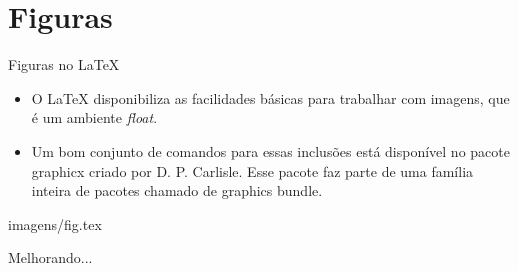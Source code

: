\section{Figuras}

\begin{frame}{Figuras no \LaTeX{}}
\begin{block}{}
\begin{itemize}
 \item O \LaTeX{} disponibiliza as facilidades básicas para trabalhar com imagens, que é um ambiente \textit{float}.
\item Um bom conjunto de comandos para essas inclusões está disponível no pacote graphicx criado por D. P. Carlisle. Esse pacote faz parte de uma família inteira de pacotes chamado de graphics bundle.
\end{itemize}
\end{block}
\end{frame}

\begin{frame}


 {imagens/fig.tex}
\end{frame}

\begin{frame}{Melhorando...}

\end{frame}













